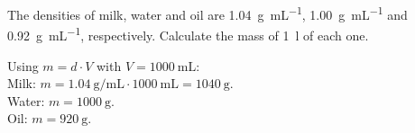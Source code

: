 \begin{exercise}
    The densities of milk, water and oil are \qty{1.04}{\g\per\mL}, \qty{1.00}{\g\per\mL} and \qty{0.92}{\g\per\mL}, respectively. Calculate the mass of \qty{1}{\litre} of each one.
    \begin{solu}
        Using \(m = d \cdot V\) with \(V = \qty{1000}{\mL}\): \\
        Milk: \(m = \qty{1.04}{\g\per\mL} \cdot \qty{1000}{\mL} = \qty{1040}{\g}\). \\
        Water: \(m = \qty{1000}{\g}\). \\
        Oil: \(m = \qty{920}{\g}\).
    \end{solu}
\end{exercise}

%
%
%
%
